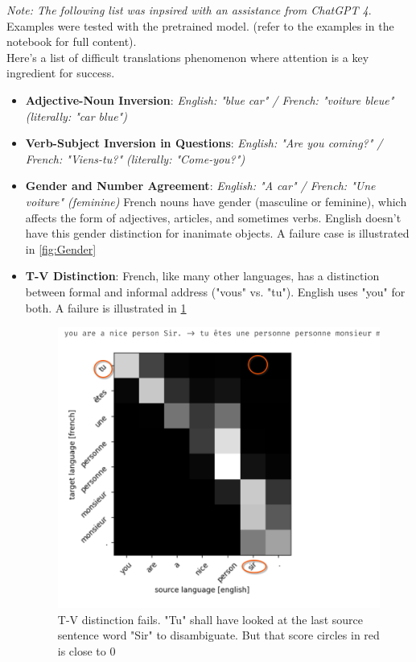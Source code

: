 \documentclass[a4paper]{article}
\begin{document}
\textit{Note: The following list was inpsired with an assistance from ChatGPT 4}. Examples were tested with the pretrained model. (refer to the examples in the notebook for full content).\\
Here's a list of difficult translations phenomenon where attention is a key ingredient for success.
\begin{itemize}
\item \textbf{Adjective-Noun Inversion}: \textit{English: "blue car" / French: "voiture bleue" (literally: "car blue")}
\item \textbf{Verb-Subject Inversion in Questions}: \textit{English: "Are you coming?" / French: "Viens-tu?" (literally: "Come-you?")}
\item \textbf{Gender and Number Agreement}: \textit{English: "A car" / French: "Une voiture" (feminine)} French nouns have gender (masculine or feminine), which affects the form of adjectives, articles, and sometimes verbs. English doesn't have this gender distinction for inanimate objects. A failure case is illustrated in \ref{fig:Gender}
\item \textbf{T-V Distinction}: French, like many other languages, has a distinction between formal and informal address ("vous" vs. "tu"). English uses "you" for both. A failure is illustrated in \ref{fig:T-V distinction}

\begin{figure}[h!]
    \centering
	\includegraphics[width=.6\textwidth]{figures/Tu_Vous.png}
	\caption{T-V distinction fails. "Tu" shall have looked at the last source sentence word "Sir" to disambiguate.  But that score circles in red is close to 0\label{fig:T-V distinction}}
\end{figure}


\end{itemize}
\end{document}

